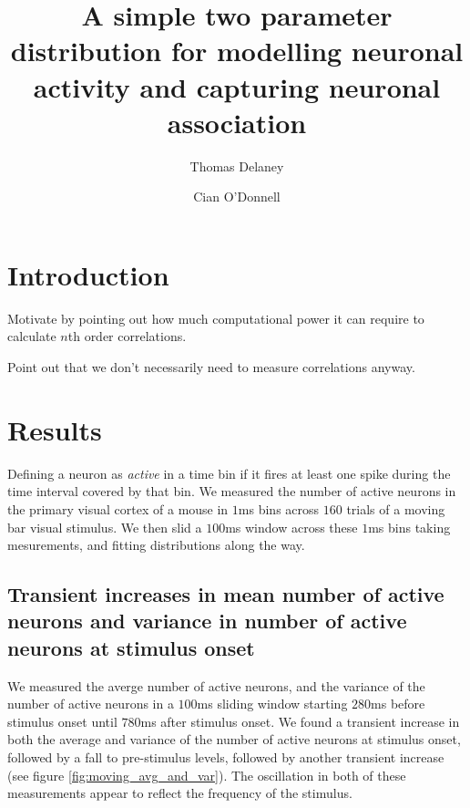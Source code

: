 \documentclass[a4paper,12pt]{article}
\title{A simple two parameter distribution for modelling neuronal activity and capturing neuronal association}
\date{}
\author[1]{Thomas Delaney}
\author[1]{Cian O'Donnell}
\affil[1]{School of Computer Science, Electrical and Electronic Engineering, and Engineering Mathematics, University of Bristol, Bristol, United Kingdom.}
\theoremstyle{definition}
\begin{document}
\maketitle



\section{Introduction}
  Motivate by pointing out how much computational power it can require to calculate $n$th order correlations.

  Point out that we don't necessarily need to measure correlations anyway.

\section{Results}
Defining a neuron as \textit{active} in a time bin if it fires at least one spike during the time interval covered by that bin. We measured the number of active neurons in the primary visual cortex of a mouse in $1$ms bins across $160$ trials of a moving bar visual stimulus. We then slid a $100$ms window across these $1$ms bins taking mesurements, and fitting distributions along the way.

  \subsection{Transient increases in mean number of active neurons and variance in number of active neurons at stimulus onset}
  We measured the averge number of active neurons, and the variance of the number of active neurons in a $100$ms sliding window starting $280$ms before stimulus onset until $780$ms after stimulus onset. We found a transient increase in both the average and variance of the number of active neurons at stimulus onset, followed by a fall to pre-stimulus levels, followed by another transient increase (see figure \ref{fig:moving_avg_and_var}). The oscillation in both of these measurements appear to reflect the frequency of the stimulus.
\end{document}
